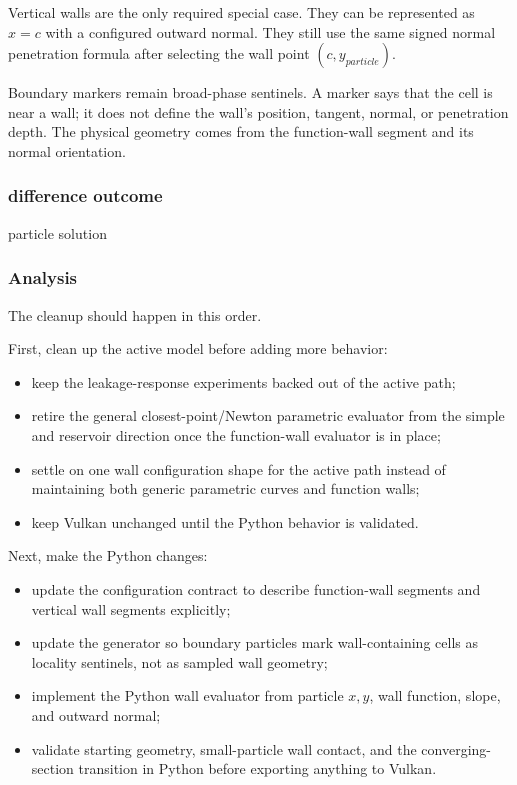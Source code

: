 Vertical walls are the only required special case.  They can be represented as
\(x = c\) with a configured outward normal.  They still use the same signed
normal penetration formula after selecting the wall point
\((c, y_{particle})\).

Boundary markers remain broad-phase sentinels.  A marker says that the cell is
near a wall; it does not define the wall's position, tangent, normal, or
penetration depth.  The physical geometry comes from the function-wall segment
and its normal orientation.

\subsubsection{difference outcome}

particle solution

\subsubsection{Analysis}

The cleanup should happen in this order.

First, clean up the active model before adding more behavior:
\begin{itemize}
    \item keep the leakage-response experiments backed out of the active path;
    \item retire the general closest-point/Newton parametric evaluator from the
          simple and reservoir direction once the function-wall evaluator is in
          place;
    \item settle on one wall configuration shape for the active path instead of
          maintaining both generic parametric curves and function walls;
    \item keep Vulkan unchanged until the Python behavior is validated.
\end{itemize}

Next, make the Python changes:
\begin{itemize}
    \item update the configuration contract to describe function-wall segments
          and vertical wall segments explicitly;
    \item update the generator so boundary particles mark wall-containing cells
          as locality sentinels, not as sampled wall geometry;
    \item implement the Python wall evaluator from particle \(x,y\), wall
          function, slope, and outward normal;
    \item validate starting geometry, small-particle wall contact, and the
          converging-section transition in Python before exporting anything to
          Vulkan.
\end{itemize}

